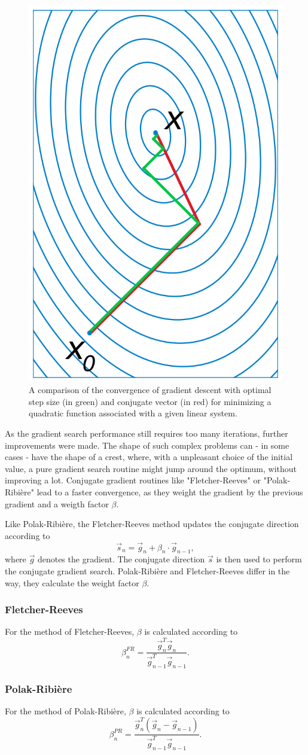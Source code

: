 \begin{figure}[h]
\centering
\includegraphics[width=0.25\linewidth]{images/conjugate_gradient_example.png}
\caption{A comparison of the convergence of gradient descent with optimal step size (in green) and conjugate vector (in red) for minimizing a quadratic function associated with a given linear system\cite{wiki:conj_grad}.}
\label{fig:conj_grad_ex}
\end{figure}
As the gradient search performance still requires too many iterations, further improvements were made.
The shape of such complex problems can - in some cases - have the shape of a crest, where, with a unpleasant choice of the initial value, a pure gradient search routine might jump around the optimum, without improving a lot.
Conjugate gradient routines like "Fletcher-Reeves" or "Polak-Ribi\`{e}re" lead to a faster convergence, as they weight the gradient by the previous gradient and a weigth factor $\beta$. 

Like Polak-Ribi\`{e}re, the Fletcher-Reeves method updates the conjugate direction according to 
\begin{equation}
\vec{s}_n = \vec{g}_n + \beta_n\cdot\vec{g}_{n-1},
\label{eq:conj_update}
\end{equation}
where $\vec{g}$ denotes the gradient.
The conjugate direction $\vec{s}$ is then used to perform the conjugate gradient search.
Polak-Ribi\`{e}re and Fletcher-Reeves differ in the way, they calculate the weight factor $\beta$.

\subsubsection{Fletcher-Reeves}
For the method of Fletcher-Reeves, $\beta$ is calculated according to~\cite{Fletcher64}
\begin{equation}
\beta_n^{FR} = \frac{\vec{g}_n^T \vec{g}_n}{\vec{g}_{n-1}^T \vec{g}_{n-1}}.
\label{eq:beta_fr}
\end{equation}

\subsubsection{Polak-Ribi\`{e}re}
For the method of Polak-Ribi\`{e}re, $\beta$ is calculated according to~\cite{Polak69}
\begin{equation}
\beta_n^{PR} = \frac{\vec{g}_n^T\left(\vec{g}_n-\vec{g}_{n-1}\right)}{\vec{g}_{n-1}^T \vec{g}_{n-1}}.
\label{eq:beta_fr}
\end{equation}

